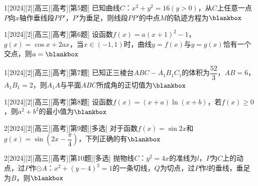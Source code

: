 \begin{example}{1}[2024][2][高三][高考][第5题]
已知曲线$C$：$x^2+y^2=16(y>0)$，从$C$上任意一点$P$向$x$轴作垂线段$PP'$，$P'$为垂足，则线段$PP'$的中点$M$的轨迹方程为$\blankbox$
\begin{choices}
\end{choices}
\end{example}

\begin{example}{1}[2024][2][高三][高考][第6题]
设函数$f(x)=a(x+1)^2-1$，$g(x)=\cos x+2ax$，当$x\in(-1,1)$时，曲线$y=f(x)$与$y=g(x)$恰有一个交点，则$a=\blankbox$
\begin{choices}
\end{choices}
\end{example}

\begin{example}{1}[2024][2][高三][高考][第7题]
已知正三棱台$ABC-A_1B_1C_1$的体积为$\dfrac{52}{3}$，$AB=6$，$A_1B_1=2$，则$A_1A$与平面$ABC$所成角的正切值为$\blankbox$
\begin{choices}
\end{choices}
\end{example}

\begin{example}{1}[2024][2][高三][高考][第8题]
设函数$f(x)=(x+a)\ln(x+b)$，若$f(x)\ge 0$，则$a^2+b^2$的最小值为$\blankbox$
\begin{choices}
\end{choices}
\end{example}
\begin{example}{2}[2024][2][高三][高考][第9题][多选]
对于函数$f(x)=\sin 2x$和$g(x)=\sin\left(2x-\dfrac{\pi}{4}\right)$，下列正确的有$\blankbox$
\begin{choices}
\end{choices}
\end{example}

\begin{example}{2}[2024][2][高三][高考][第10题][多选]
抛物线$C$：$y^2=4x$的准线为$l$，$P$为$C$上的动点，过$P$作$\odot A$：$x^2+(y-4)^2=1$的一条切线，$Q$为切点，过$P$作$l$的垂线，垂足为$B$，则$\blankbox$
\begin{choices}
\end{choices}
\end{example}

